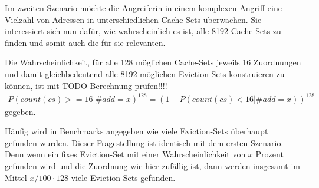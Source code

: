 %


Im zweiten Szenario möchte die Angreiferin in einem komplexen Angriff eine Vielzahl von Adressen in unterschiedlichen Cache-Sets überwachen. 
Sie interessiert sich nun dafür, wie wahrscheinlich es ist, alle 8192 Cache-Sets zu finden und somit auch die für sie relevanten. 

Die Wahrscheinlichkeit, für alle 128 möglichen Cache-Sets jeweils 16 Zuordnungen und damit gleichbedeutend alle 8192 möglichen Eviction Sets konstruieren zu können, ist mit TODO Berechnung prüfen!!!!
\begin{align*}
P(count(cs)>=16|\#add = x)^{128} = (1-P(count(cs)<16|\#add = x))^{128}
\end{align*}
gegeben.  


%


Häufig wird in Benchmarks angegeben wie viele Eviction-Sets überhaupt gefunden wurden.
Dieser Fragestellung ist identisch mit dem ersten Szenario.
Denn wenn ein fixes Eviction-Set mit einer Wahrscheinlichkeit von $x$ Prozent gefunden wird und die Zuordnung wie hier zufällig ist, dann werden insgesamt im Mittel $x/100 \cdot 128$ viele Eviction-Sets gefunden.


